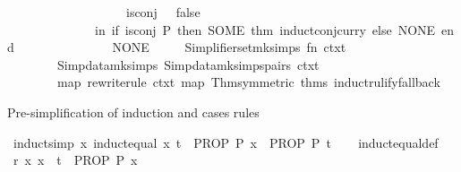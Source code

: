 \begin{isabellebody}
\ \ \ \ \ \ \ \ \ \ \ \ \ \ \ \ \ \ {\isacharbar}{\kern0pt}\ is{\isacharunderscore}{\kern0pt}conj\ {\isacharunderscore}{\kern0pt}\ {\isacharequal}{\kern0pt}\ false\isanewline
\ \ \ \ \ \ \ \ \ \ \ \ \ \ in\ if\ is{\isacharunderscore}{\kern0pt}conj\ P\ then\ SOME\ {\isacharat}{\kern0pt}{\isacharbraceleft}{\kern0pt}thm\ induct{\isacharunderscore}{\kern0pt}conj{\isacharunderscore}{\kern0pt}curry{\isacharbraceright}{\kern0pt}\ else\ NONE\ end\isanewline
\ \ \ \ \ \ \ \ \ \ \ \ {\isacharbar}{\kern0pt}\ {\isacharunderscore}{\kern0pt}\ {\isacharequal}{\kern0pt}{\isachargreater}{\kern0pt}\ NONE{\isacharparenright}{\kern0pt}{\isacharbraceright}{\kern0pt}{\isacharbrackright}{\kern0pt}\isanewline
\ \ \ \ {\isacharbar}{\kern0pt}{\isachargreater}{\kern0pt}\ Simplifier{\isachardot}{\kern0pt}set{\isacharunderscore}{\kern0pt}mksimps\ {\isacharparenleft}{\kern0pt}fn\ ctxt\ {\isacharequal}{\kern0pt}{\isachargreater}{\kern0pt}\isanewline
\ \ \ \ \ \ \ \ Simpdata{\isachardot}{\kern0pt}mksimps\ Simpdata{\isachardot}{\kern0pt}mksimps{\isacharunderscore}{\kern0pt}pairs\ ctxt\ {\isacharhash}{\kern0pt}{\isachargreater}{\kern0pt}\isanewline
\ \ \ \ \ \ \ \ map\ {\isacharparenleft}{\kern0pt}rewrite{\isacharunderscore}{\kern0pt}rule\ ctxt\ {\isacharparenleft}{\kern0pt}map\ Thm{\isachardot}{\kern0pt}symmetric\ {\isacharat}{\kern0pt}{\isacharbraceleft}{\kern0pt}thms\ induct{\isacharunderscore}{\kern0pt}rulify{\isacharunderscore}{\kern0pt}fallback{\isacharbraceright}{\kern0pt}{\isacharparenright}{\kern0pt}{\isacharparenright}{\kern0pt}{\isacharparenright}{\kern0pt}{\isacharparenright}{\kern0pt}\isanewline
{\isacartoucheclose}%
\endisatagML
{\isafoldML}%
%
\isadelimML
%
\endisadelimML
%
\begin{isamarkuptext}%
Pre-simplification of induction and cases rules%
\end{isamarkuptext}\isamarkuptrue%
\isamarkupfalse%
\ {\isacharbrackleft}{\kern0pt}induct{\isacharunderscore}{\kern0pt}simp{\isacharbrackright}{\kern0pt}{\isacharcolon}{\kern0pt}\ {\isachardoublequoteopen}{\isacharparenleft}{\kern0pt}{\isasymAnd}x{\isachardot}{\kern0pt}\ induct{\isacharunderscore}{\kern0pt}equal\ x\ t\ {\isasymLongrightarrow}\ PROP\ P\ x{\isacharparenright}{\kern0pt}\ {\isasymequiv}\ PROP\ P\ t{\isachardoublequoteclose}\isanewline
%
\isadelimproof
\ \ %
\endisadelimproof
%
\isatagproof
{}\isamarkupfalse%
\ induct{\isacharunderscore}{\kern0pt}equal{\isacharunderscore}{\kern0pt}def\isanewline
{}\isamarkupfalse%
\isanewline
\ \ \isamarkupfalse%
\ r{\isacharcolon}{\kern0pt}\ {\isachardoublequoteopen}{\isasymAnd}x{\isachardot}{\kern0pt}\ x\ {\isacharequal}{\kern0pt}\ t\ {\isasymLongrightarrow}\ PROP\ P\ x{\isachardoublequoteclose}\isanewline

\end{isabellebody}
